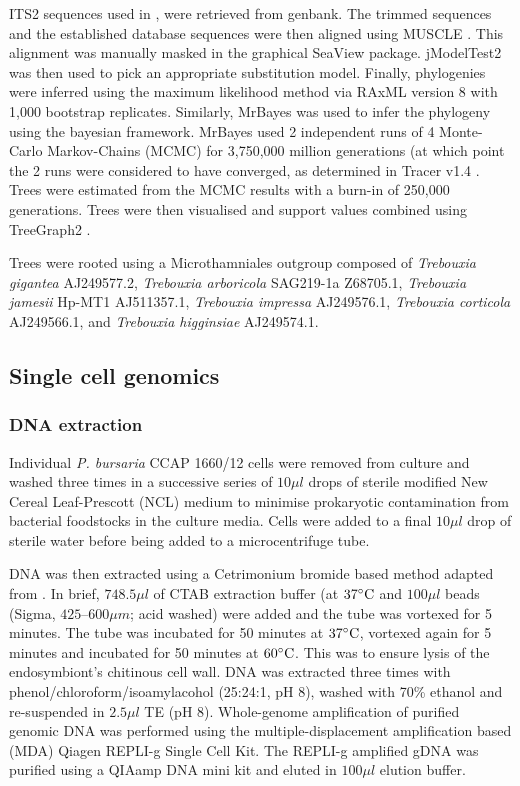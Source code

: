 ITS2 sequences used in \citep{Hoshina2010}, \citep{Hoshina2013} were retrieved
from genbank. 
The trimmed sequences and the established database sequences were then
aligned using MUSCLE \citep{Edgar2004}. This alignment was manually masked in the graphical 
SeaView \citep{Gouy2010} package.
jModelTest2 \citep{Guindon2003,Darriba2012} was then used to pick an appropriate substitution model.
Finally, phylogenies were inferred using the maximum likelihood
method via RAxML version 8 \citep{Stamatakis2014} with 1,000 bootstrap replicates.
Similarly, MrBayes \citep{Huelsenbeck2001} was used to infer the phylogeny using the bayesian
framework.  MrBayes used 2 independent runs of 4 Monte-Carlo Markov-Chains (MCMC) for
3,750,000 million generations (at which point the 2 runs were considered to have converged, 
as determined in Tracer v1.4 \citep{rambaut2007tracer}.  Trees were estimated
from the MCMC results with a burn-in of 250,000 generations.
Trees were then visualised and support values combined using TreeGraph2 \citep{Stover2010}.

Trees were rooted using a Microthamniales outgroup composed of
\textit{Trebouxia gigantea} AJ249577.2, \textit{Trebouxia arboricola} SAG219-1a Z68705.1,
\textit{Trebouxia jamesii} Hp-MT1 AJ511357.1, \textit{Trebouxia impressa} AJ249576.1,
\textit{Trebouxia corticola} AJ249566.1, and \textit{Trebouxia higginsiae} AJ249574.1.

\subsection{Single cell genomics}

\subsubsection{DNA extraction}

Individual \textit{P. bursaria} CCAP 1660/12 cells were removed from culture 
and washed three times in a successive series of 
\(10 \mu l\) drops of sterile modified 
New Cereal Leaf-Prescott (NCL) medium to minimise prokaryotic contamination from 
bacterial foodstocks in the culture media. 
Cells were added to a final \(10\mu l\) drop of sterile water before being added
to a microcentrifuge tube.

DNA was then extracted using a Cetrimonium bromide based method adapted from \citep{Winnepenninckx1993}. 
In brief,  \(748.5 \mu l\) of CTAB extraction buffer (at \(37\celsius\) and \(100 \mu l\) beads (Sigma, \(425 – 600 \mu m\); acid washed) 
were added and the tube was vortexed for 5 minutes. 
The tube was incubated for 50 minutes at \(37\celsius\), 
vortexed again for 5 minutes and incubated for 50 minutes at \(60\celsius\).  
This was to ensure lysis of the endosymbiont's chitinous cell wall.
DNA was extracted three times with phenol/chloroform/isoamylacohol (25:24:1, pH 8), washed with 70\% ethanol and 
re-suspended in \(2.5 \mu l\) TE (pH 8). 
Whole-genome amplification of purified genomic DNA was performed using the multiple-displacement amplification based
(MDA) Qiagen REPLI-g Single Cell Kit. 
The REPLI-g amplified gDNA was purified using a QIAamp DNA mini kit and eluted in \(100 \mu l\) elution buffer.

